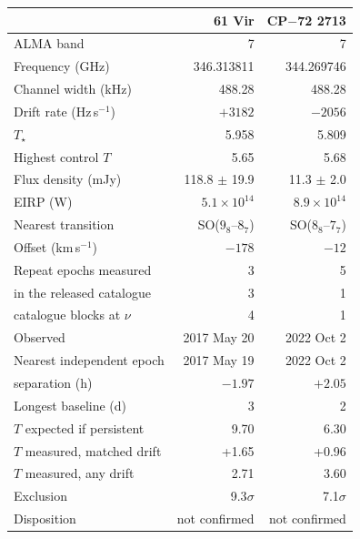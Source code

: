 \begin{tabular}{@{}lrr@{}}
\hline
 & 61 Vir & CP$-$72 2713 \\
\hline
ALMA band & 7 & 7 \\
Frequency (GHz) & 346.313811 & 344.269746 \\
Channel width (kHz) & 488.28 & 488.28 \\
Drift rate (Hz\,s$^{-1}$) & $+3182$ & $-2056$ \\
$T_\star$ & 5.958 & 5.809 \\
Highest control $T$ & 5.65 & 5.68 \\
Flux density (mJy) & 118.8 $\pm$ 19.9 & 11.3 $\pm$ 2.0 \\
EIRP (W) & $5.1 \times 10^{14}$ & $8.9 \times 10^{14}$ \\
Nearest transition & SO($9_{8}$--$8_{7}$) & SO($8_{8}$--$7_{7}$) \\
Offset (km\,s$^{-1}$) & $-178$ & $-12$ \\
Repeat epochs measured & 3 & 5 \\
\quad in the released catalogue & 3 & 1 \\
\quad catalogue blocks at $\nu$ & 4 & 1 \\
Observed & 2017 May 20 & 2022 Oct 2 \\
Nearest independent epoch & 2017 May 19 & 2022 Oct 2 \\
\quad separation (h) & $-1.97$ & $+2.05$ \\
Longest baseline (d) & 3 & 2 \\
$T$ expected if persistent & 9.70 & 6.30 \\
$T$ measured, matched drift & +1.65 & +0.96 \\
$T$ measured, any drift & 2.71 & 3.60 \\
Exclusion & 9.3$\sigma$ & 7.1$\sigma$ \\
Disposition & not confirmed & not confirmed \\
\hline
\end{tabular}
